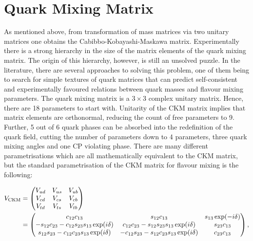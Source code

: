 \section{Quark Mixing Matrix}
\indent As mentioned above, from transformation of mass matrices via two unitary matrices one obtains the Cabibbo-Kobayashi-Maskawa matrix. Experimentally there is a strong hierarchy in the size of the matrix elements of the quark mixing matrix. The origin of this hierarchy, however, is still an unsolved puzzle. In the literature, there  are several approaches to solving this problem, one of them being to search for simple textures of quark matrices that can predict self-consistent and experimentally favoured relations between quark masses and flavour mixing parameters. 
\newline 
\indent The quark mixing matrix is a $3 \times 3$ complex unitary matrix. Hence, there are 18 parameters to start with. Unitarity of the CKM matrix implies that matrix elements are orthonormal, reducing the count of free parameters to 9. Further, 5 out of 6 quark phases can be absorbed into the redefinition of the quark field, cutting the number of parameters down to 4 parameters, three quark mixing angles and one CP violating phase\cite{book}.
\newline
\indent There are many different parametrisations\cite{param} which are all mathematically equivalent to the CKM matrix, but the standard parametrisation of the CKM matrix for flavour mixing is the following:


\begin{align}
V_{\rm CKM} &=  \begin{pmatrix}   V_{ud} & V_{us} & V_{ub} \cr
    V_{cd} & V_{cs} & V_{cb} \cr
    V_{td} & V_{ts} & V_{tb} \cr \end{pmatrix} \\
 &= \begin{pmatrix}c_{12}c_{13}& s_{12}c_{13} & s_{13}\exp(-i\delta) \cr
-s_{12}c_{23}-c_{12}s_{23}s_{13}\exp(i\delta) & c_{12}c_{23}- 
s_{12}s_{23}s_{13}\exp(i\delta) & s_{23}c_{13} \cr 
s_{12}s_{23}- c_{12}c_{23}s_{13}\exp(i\delta) & 
-c_{12}s_{23}-s_{12}c_{23}s_{13}\exp(i\delta) & c_{23}c_{13}\end{pmatrix},
\end{align}

